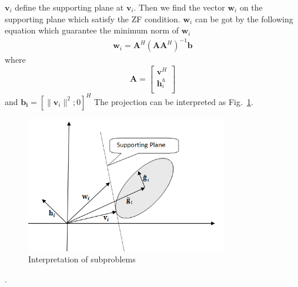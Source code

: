 \documentclass[conference]{IEEEtran}
\begin{document}
$\mathbf{v}_i$ define the supporting plane at $\mathbf{v}_i$. Then we find the vector $\mathbf{w}_i$ on the supporting plane which satisfy the ZF condition. $\mathbf{w}_i$ can be got by the following equation which guarantee the minimum norm of $\mathbf{w}_i$
\begin{eqnarray}
\mathbf{w}_i = \mathbf{A}^H(\mathbf{A}\mathbf{A}^H)^{-1}\mathbf{b}
\end{eqnarray}
where
\begin{equation}\label{eq:A}
\mathbf{A}= \left[ {\begin{array}{c}
		\mathbf{v}^H\\
		\mathbf{h}_i^h\\
		\end{array} } \right]
\end{equation}
and $\mathbf{b_i} = [\|\mathbf{v}_i\|^2;0]^H$
The projection can be interpreted as Fig.~\ref{fig:projection}.
\begin{figure}[ht]
	\centering
	\includegraphics[width=8.8cm]{projection.png} %
	\caption{Interpretation of subproblems}
	\label{fig:projection}
\end{figure}.
%
%
\end{document}
